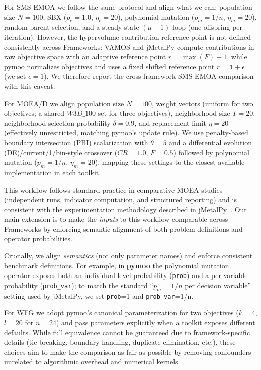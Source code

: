 \documentclass[journal]{IEEEtran}
\newcommand{\VAMOS}{VAMOS}
\begin{document}
For SMS-EMOA we follow the same protocol and align what we can: population size $N=100$, SBX ($p_c=1.0$, $\eta_c=20$), polynomial mutation ($p_m=1/n$, $\eta_m=20$), random parent selection, and a steady-state $(\mu+1)$ loop (one offspring per iteration). However, the hypervolume-contribution reference point is not defined consistently across Frameworks: \VAMOS{} and jMetalPy compute contributions in raw objective space with an adaptive reference point $r = \max(F) + 1$, while pymoo normalizes objectives and uses a fixed shifted reference point $r = \mathbf{1} + \epsilon$ (we set $\epsilon=1$). We therefore report the cross-framework SMS-EMOA comparison with this caveat.

For MOEA/D we align population size $N=100$, weight vectors (uniform for two objectives; a shared $W3D\_100$ set for three objectives), neighborhood size $T=20$, neighborhood selection probability $\delta=0.9$, and replacement limit $\eta=20$ (effectively unrestricted, matching pymoo's update rule). We use penalty-based boundary intersection (PBI) scalarization with $\theta=5$ and a differential evolution (DE)/current/1/bin-style crossover ($CR=1.0$, $F=0.5$) followed by polynomial mutation ($p_m=1/n$, $\eta_m=20$), mapping these settings to the closest available implementation in each toolkit.

This workflow follows standard practice in comparative MOEA studies (independent runs, indicator computation, and structured reporting) and is consistent with the experimentation methodology described in jMetalPy~\cite{BNG+19}. Our main extension is to make the \emph{inputs} to this workflow comparable across Frameworks by enforcing semantic alignment of both problem definitions and operator probabilities.

Crucially, we align \emph{semantics} (not only parameter names) and enforce consistent benchmark definitions. For example, in \textbf{pymoo} the polynomial mutation operator exposes both an individual-level probability (\texttt{prob}) and a per-variable probability (\texttt{prob\_var}); to match the standard ``$p_m=1/n$ per decision variable'' setting used by jMetalPy, we set \texttt{prob}=1 and \texttt{prob\_var}=1/n.

For WFG we adopt pymoo's canonical parameterization for two objectives ($k=4$, $l=20$ for $n=24$) and pass parameters explicitly when a toolkit exposes different defaults. While full equivalence cannot be guaranteed due to framework-specific details (tie-breaking, boundary handling, duplicate elimination, etc.), these choices aim to make the comparison as fair as possible by removing confounders unrelated to algorithmic overhead and numerical kernels.
\end{document}
